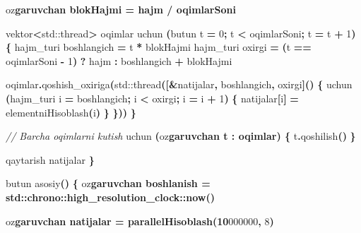 \documentclass[a4paper,11pt,twoside,openright]{book}
\newenvironment{Shaded}{\begin{snugshade}}{\end{snugshade}}
\newcommand{\BaseNTok}[1]{\textcolor[rgb]{0.00,0.00,0.81}{#1}}
\newcommand{\BuiltInTok}[1]{#1}
\newcommand{\CharTok}[1]{\textcolor[rgb]{0.31,0.60,0.02}{#1}}
\newcommand{\CommentTok}[1]{\textcolor[rgb]{0.56,0.35,0.01}{\textit{#1}}}
\newcommand{\DecValTok}[1]{\textcolor[rgb]{0.00,0.00,0.81}{#1}}
\newcommand{\ErrorTok}[1]{\textcolor[rgb]{0.64,0.00,0.00}{\textbf{#1}}}
\newcommand{\NormalTok}[1]{#1}
\newcommand{\OperatorTok}[1]{\textcolor[rgb]{0.81,0.36,0.00}{\textbf{#1}}}
\begin{document}
\begin{Shaded}
\begin{Highlighting}[]
\NormalTok{    o}\CharTok{\textquotesingle{}z}\ErrorTok{garuvchan blokHajmi = hajm / oqimlarSoni}

\NormalTok{    vektor}\OperatorTok{\textless{}}\BuiltInTok{std::}\NormalTok{thread}\OperatorTok{\textgreater{}}\NormalTok{ oqimlar}
\NormalTok{    uchun }\OperatorTok{(}\NormalTok{butun t }\OperatorTok{=} \DecValTok{0}\OperatorTok{;}\NormalTok{ t }\OperatorTok{\textless{}}\NormalTok{ oqimlarSoni}\OperatorTok{;}\NormalTok{ t }\OperatorTok{=}\NormalTok{ t }\OperatorTok{+} \DecValTok{1}\OperatorTok{)} \OperatorTok{\{}
\NormalTok{        hajm\_turi boshlangich }\OperatorTok{=}\NormalTok{ t }\OperatorTok{*}\NormalTok{ blokHajmi}
\NormalTok{        hajm\_turi oxirgi }\OperatorTok{=} \OperatorTok{(}\NormalTok{t }\OperatorTok{==}\NormalTok{ oqimlarSoni }\OperatorTok{{-}} \DecValTok{1}\OperatorTok{)} \OperatorTok{?}\NormalTok{ hajm }\OperatorTok{:}\NormalTok{ boshlangich }\OperatorTok{+}\NormalTok{ blokHajmi}

\NormalTok{        oqimlar}\OperatorTok{.}\NormalTok{qoshish\_oxiriga}\OperatorTok{(}\BuiltInTok{std::}\NormalTok{thread}\OperatorTok{([\&}\NormalTok{natijalar}\OperatorTok{,}\NormalTok{ boshlangich}\OperatorTok{,}\NormalTok{ oxirgi}\OperatorTok{]()} \OperatorTok{\{}
\NormalTok{            uchun }\OperatorTok{(}\NormalTok{hajm\_turi i }\OperatorTok{=}\NormalTok{ boshlangich}\OperatorTok{;}\NormalTok{ i }\OperatorTok{\textless{}}\NormalTok{ oxirgi}\OperatorTok{;}\NormalTok{ i }\OperatorTok{=}\NormalTok{ i }\OperatorTok{+} \DecValTok{1}\OperatorTok{)} \OperatorTok{\{}
\NormalTok{                natijalar}\OperatorTok{[}\NormalTok{i}\OperatorTok{]} \OperatorTok{=}\NormalTok{ elementniHisoblash}\OperatorTok{(}\NormalTok{i}\OperatorTok{)}
            \OperatorTok{\}}
        \OperatorTok{\}))}
    \OperatorTok{\}}

    \CommentTok{// Barcha oqimlarni kutish}
\NormalTok{    uchun }\OperatorTok{(}\NormalTok{o}\CharTok{\textquotesingle{}z}\ErrorTok{garuvchan t : oqimlar) \{}
\NormalTok{        t}\OperatorTok{.}\NormalTok{qoshilish}\OperatorTok{()}
    \OperatorTok{\}}

\NormalTok{    qaytarish natijalar}
\OperatorTok{\}}

\NormalTok{butun asosiy}\OperatorTok{()} \OperatorTok{\{}
\NormalTok{    o}\CharTok{\textquotesingle{}z}\ErrorTok{garuvchan boshlanish = std::chrono::high\_resolution\_clock::now()}

\NormalTok{    o}\CharTok{\textquotesingle{}z}\ErrorTok{garuvchan natijalar = parallelHisoblash(10}\CharTok{\textquotesingle{}}\BaseNTok{000\textquotesingle{}000}\OperatorTok{,} \DecValTok{8}\OperatorTok{)}


\end{Highlighting}
\end{Shaded}
\end{document}
